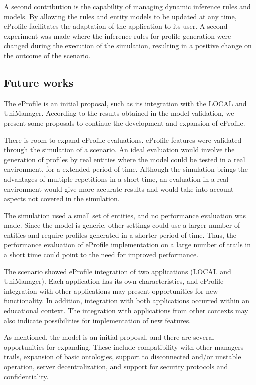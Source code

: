 \documentclass{svjour3}                     %
\begin{document}
A second contribution is the capability of managing dynamic inference rules and models. By allowing the rules and entity models to be updated at any time, eProfile facilitates the adaptation of the application to its user. A second experiment was made where the inference rules for profile generation were changed during the execution of the simulation, resulting in a positive change on the outcome of the scenario.

\subsection{Future works}

The eProfile is an initial proposal, such as its integration with the LOCAL and UniManager. According to the results obtained in the model validation, we present some proposals to continue the development and expansion of eProfile.

There is room to expand eProfile evaluations. eProfile features were validated through the simulation of a scenario. An ideal evaluation would involve the generation of profiles by real entities where the model could be tested in a real environment, for a extended period of time. Although the simulation brings the advantages of multiple repetitions in a short time, an evaluation in a real environment would give more accurate results and would take into account aspects not covered in the simulation.

The simulation used a small set of entities, and no performance evaluation was made. Since the model is generic, other settings could use a larger number of entities and require profiles generated in a shorter period of time. Thus, the performance evaluation of eProfile implementation on a large number of trails in a short time could point to the need for improved performance.

The scenario showed eProfile integration of two applications (LOCAL and UniManager). Each application has its own characteristics, and eProfile integration with other applications may present opportunities for new functionality. In addition, integration with both applications occurred within an educational context. The integration with applications from other contexts may also indicate possibilities for implementation of new features.

As mentioned, the model is an initial proposal, and there are several opportunities for expanding. These include compatibility with other managers trails, expansion of basic ontologies, support to disconnected and/or unstable operation, server decentralization, and support for security protocols and confidentiality.





%
%
%

\end{document}
